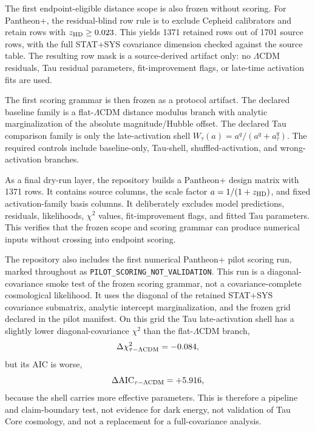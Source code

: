 \documentclass[11pt]{article}
\begin{document}
The first endpoint-eligible distance scope is also frozen without scoring. For
Pantheon+, the residual-blind row rule is to exclude Cepheid calibrators and
retain rows with \(z_{\rm HD}\ge 0.023\). This yields 1371 retained rows out of
1701 source rows, with the full STAT+SYS covariance dimension checked against
the source table. The resulting row mask is a source-derived artifact only:
no \(\Lambda\)CDM residuals, Tau residual parameters, fit-improvement flags, or
late-time activation fits are used.

The first scoring grammar is then frozen as a protocol artifact. The declared
baseline family is a flat-\(\Lambda\)CDM distance modulus branch with analytic
marginalization of the absolute magnitude/Hubble offset. The declared Tau
comparison family is only the late-activation shell
\(W_\tau(a)=a^q/(a^q+a_\tau^q)\). The required controls include baseline-only,
Tau-shell, shuffled-activation, and wrong-activation branches.

As a final dry-run layer, the repository builds a Pantheon+ design matrix with
1371 rows. It contains source columns, the scale factor \(a=1/(1+z_{\rm HD})\),
and fixed activation-family basis columns. It deliberately excludes model
predictions, residuals, likelihoods, \(\chi^2\) values, fit-improvement flags,
and fitted Tau parameters. This verifies that the frozen scope and scoring
grammar can produce numerical inputs without crossing into endpoint scoring.

The repository also includes the first numerical Pantheon+ pilot scoring run,
marked throughout as \texttt{PILOT\_\allowbreak{}SCORING\_\allowbreak{}NOT\_\allowbreak{}VALIDATION}. This run is
a diagonal-covariance smoke test of the frozen scoring grammar, not a
covariance-complete cosmological likelihood. It uses the diagonal of the
retained STAT+SYS covariance submatrix, analytic intercept marginalization, and
the frozen grid declared in the pilot manifest. On this grid the Tau
late-activation shell has a slightly lower diagonal-covariance \(\chi^2\) than
the flat-\(\Lambda\)CDM branch,
\[
\Delta\chi^2_{\tau-\Lambda{\rm CDM}}=-0.084,
\]
but its AIC is worse,
\[
\Delta{\rm AIC}_{\tau-\Lambda{\rm CDM}}=+5.916,
\]
because the shell carries more effective parameters. This is therefore a
pipeline and claim-boundary test, not evidence for dark energy, not validation
of Tau Core cosmology, and not a replacement for a full-covariance analysis.
\end{document}
